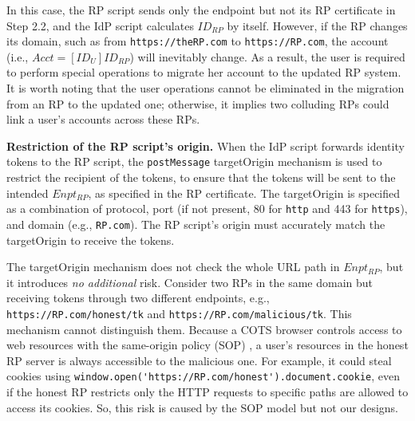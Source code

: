 In this case, the RP script sends only the endpoint but not its RP certificate in Step 2.2, and the IdP script calculates $ID_{RP}$ by itself. %
However, if the RP changes its domain, such as from  \verb+https://theRP.com+ to \verb+https://RP.com+, the account (i.e., $Acct = [ID_U]ID_{RP}$) will inevitably change.
As a result, the user is required to perform special operations to migrate her account to the updated RP system.
It is worth noting that the user operations cannot be eliminated in the migration from an RP to the updated one;
otherwise, it implies two colluding RPs could link a user's accounts across these RPs.


\noindent \textbf{Restriction of the RP script's origin.}
When the IdP script forwards identity tokens to the RP script, the \verb+postMessage+ targetOrigin mechanism \cite{postm-targeto} is used to restrict the recipient of the tokens, to ensure that the tokens will be sent to the intended $Enpt_{RP}$, as specified in the RP certificate. The targetOrigin is specified as a combination of protocol, port (if not present, 80 for \verb+http+ and 443 for \verb+https+), and domain (e.g., \verb+RP.com+).
The RP script's origin must accurately match the targetOrigin to receive the tokens.

The targetOrigin mechanism does not check the whole URL path in $Enpt_{RP}$, but it introduces {\em no additional} risk.
Consider two RPs in the same domain but receiving tokens through two different endpoints,
 e.g., \verb+https://RP.com/honest/tk+ and \verb+https://RP.com/malicious/tk+.
This mechanism cannot distinguish them.
%
%
Because a COTS browser controls access to web resources with the same-origin policy (SOP) \cite{sop},
    a user's resources in the honest RP server is always accessible to  the malicious one.
 For example, it could steal cookies using \verb+window.open('https://RP.com/honest').document.cookie+,
 even if the honest RP restricts only the HTTP requests to specific paths are allowed to access its cookies.
%
%
 So, this risk is caused by the SOP model but not our designs.

